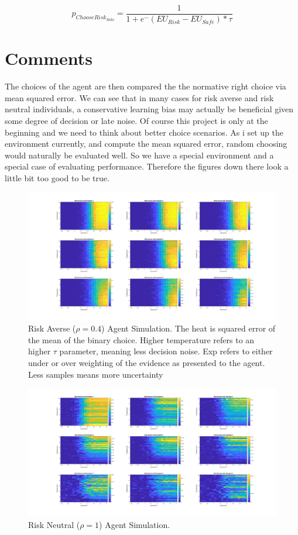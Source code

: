\documentclass[apa]{article}
\begin{document}
\begin{equation}
p_{ChooseRisk_{Solo}}=\frac{1}{1+e^-{(EU_{Risk}-EU_{Safe})*\tau}}
\end{equation}

\section{Comments}
The choices of the agent are then compared the the normative right choice via mean squared error. We can see that in many cases for risk averse and risk neutral individuals, a conservative learning bias may actually be beneficial given some degree of decision or late noise.
Of course this project is only at the beginning and we need to think about better choice scenarios. 
As i set up the environment currently, and compute the mean squared error, random choosing would naturally be evaluated well. So we have a special environment and a special case of evaluating performance. Therefore the figures down there look a little bit too good to be true.

\begin{figure}
\centering
\includegraphics[width=\textwidth]{Risk_Averse.jpg}
\caption{Risk Averse ($\rho = 0.4$) Agent Simulation. The heat is squared error of the mean of the binary choice. Higher temperature refers to an higher $\tau$ parameter, meaning less decision noise. Exp refers to either under or over weighting of the evidence as presented to the agent. Less samples means more uncertainty}
\label{fig:universe}
\end{figure}

\begin{figure}
\centering
\includegraphics[width=\textwidth]{RiskNeutral.jpg}
\caption{Risk Neutral ($\rho = 1$) Agent Simulation.}
\label{fig:universe}
\end{figure}
\end{document}
